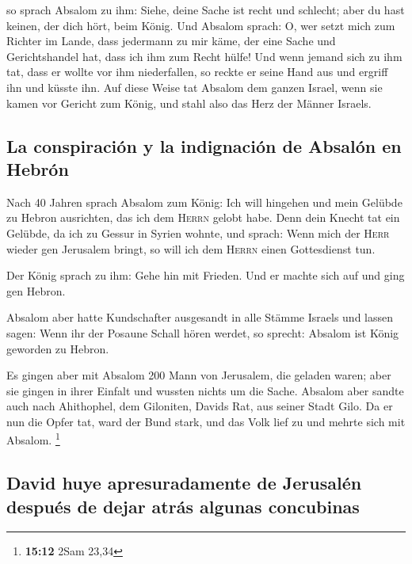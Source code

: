  so sprach Absalom zu ihm: Siehe, deine Sache ist recht
und schlecht; aber du hast keinen, der dich hört, beim König.
 Und Absalom sprach: O, wer setzt mich zum Richter im
Lande, dass jedermann zu mir käme, der eine Sache und Gerichtshandel
hat, dass ich ihm zum Recht hülfe!  Und wenn jemand sich
zu ihm tat, dass er wollte vor ihm niederfallen, so reckte er seine Hand
aus und ergriff ihn und küsste ihn.  Auf diese Weise tat
Absalom dem ganzen Israel, wenn sie kamen vor Gericht zum König, und
stahl also das Herz der Männer Israels.

\hypertarget{la-conspiraciuxf3n-y-la-indignaciuxf3n-de-absaluxf3n-en-hebruxf3n}{%
\subsection{La conspiración y la indignación de Absalón en
Hebrón}\label{la-conspiraciuxf3n-y-la-indignaciuxf3n-de-absaluxf3n-en-hebruxf3n}}

 Nach 40 Jahren sprach Absalom zum König: Ich will
hingehen und mein Gelübde zu Hebron ausrichten, das ich dem
\textsc{Herrn} gelobt habe.  Denn dein Knecht tat ein
Gelübde, da ich zu Gessur in Syrien wohnte, und sprach: Wenn mich der
\textsc{Herr} wieder gen Jerusalem bringt, so will ich dem
\textsc{Herrn} einen Gottesdienst tun.

 Der König sprach zu ihm: Gehe hin mit Frieden. Und er
machte sich auf und ging gen Hebron.

 Absalom aber hatte Kundschafter ausgesandt in alle
Stämme Israels und lassen sagen: Wenn ihr der Posaune Schall hören
werdet, so sprecht: Absalom ist König geworden zu Hebron.

 Es gingen aber mit Absalom 200 Mann von Jerusalem, die
geladen waren; aber sie gingen in ihrer Einfalt und wussten nichts um
die Sache.  Absalom aber sandte auch nach Ahithophel, dem
Giloniten, Davids Rat, aus seiner Stadt Gilo. Da er nun die Opfer tat,
ward der Bund stark, und das Volk lief zu und mehrte sich mit Absalom.
\footnote{\textbf{15:12} 2Sam 23,34}

\hypertarget{david-huye-apresuradamente-de-jerusaluxe9n-despuuxe9s-de-dejar-atruxe1s-algunas-concubinas}{%
\subsection{David huye apresuradamente de Jerusalén después de dejar
atrás algunas
concubinas}\label{david-huye-apresuradamente-de-jerusaluxe9n-despuuxe9s-de-dejar-atruxe1s-algunas-concubinas}}

